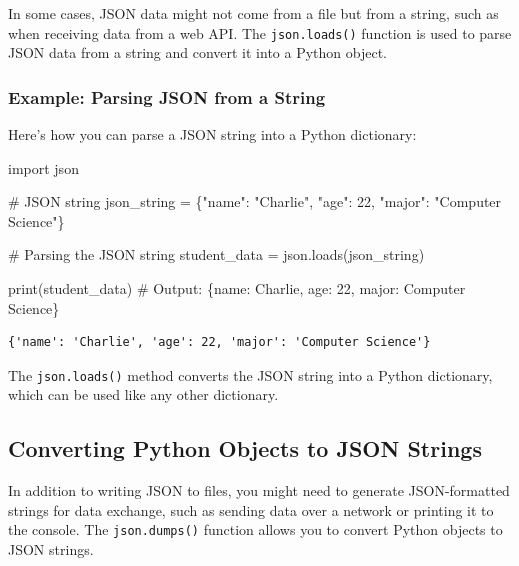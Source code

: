 \documentclass[
  letterpaper,
  DIV=11,
  numbers=noendperiod]{scrreprt}
\newenvironment{Shaded}{\begin{snugshade}}{\end{snugshade}}
\newcommand{\BuiltInTok}[1]{\textcolor[rgb]{0.00,0.23,0.31}{#1}}
\newcommand{\CommentTok}[1]{\textcolor[rgb]{0.37,0.37,0.37}{#1}}
\newcommand{\ImportTok}[1]{\textcolor[rgb]{0.00,0.46,0.62}{#1}}
\newcommand{\NormalTok}[1]{\textcolor[rgb]{0.00,0.23,0.31}{#1}}
\newcommand{\OperatorTok}[1]{\textcolor[rgb]{0.37,0.37,0.37}{#1}}
\newcommand{\StringTok}[1]{\textcolor[rgb]{0.13,0.47,0.30}{#1}}
\begin{document}
In some cases, JSON data might not come from a file but from a string,
such as when receiving data from a web API. The \texttt{json.loads()}
function is used to parse JSON data from a string and convert it into a
Python object.

\hypertarget{example-parsing-json-from-a-string}{%
\subsubsection{Example: Parsing JSON from a
String}\label{example-parsing-json-from-a-string}}

Here's how you can parse a JSON string into a Python dictionary:

\begin{Shaded}
\begin{Highlighting}[]
\ImportTok{import}\NormalTok{ json}

\CommentTok{\# JSON string}
\NormalTok{json\_string }\OperatorTok{=} \StringTok{\textquotesingle{}\{"name": "Charlie", "age": 22, "major": "Computer Science"\}\textquotesingle{}}

\CommentTok{\# Parsing the JSON string}
\NormalTok{student\_data }\OperatorTok{=}\NormalTok{ json.loads(json\_string)}

\BuiltInTok{print}\NormalTok{(student\_data)  }\CommentTok{\# Output: \{\textquotesingle{}name\textquotesingle{}: \textquotesingle{}Charlie\textquotesingle{}, \textquotesingle{}age\textquotesingle{}: 22, \textquotesingle{}major\textquotesingle{}: \textquotesingle{}Computer Science\textquotesingle{}\}}
\end{Highlighting}
\end{Shaded}

\begin{verbatim}
{'name': 'Charlie', 'age': 22, 'major': 'Computer Science'}
\end{verbatim}

The \texttt{json.loads()} method converts the JSON string into a Python
dictionary, which can be used like any other dictionary.

\hypertarget{converting-python-objects-to-json-strings}{%
\subsection{Converting Python Objects to JSON
Strings}\label{converting-python-objects-to-json-strings}}

In addition to writing JSON to files, you might need to generate
JSON-formatted strings for data exchange, such as sending data over a
network or printing it to the console. The \texttt{json.dumps()}
function allows you to convert Python objects to JSON strings.
\end{document}
